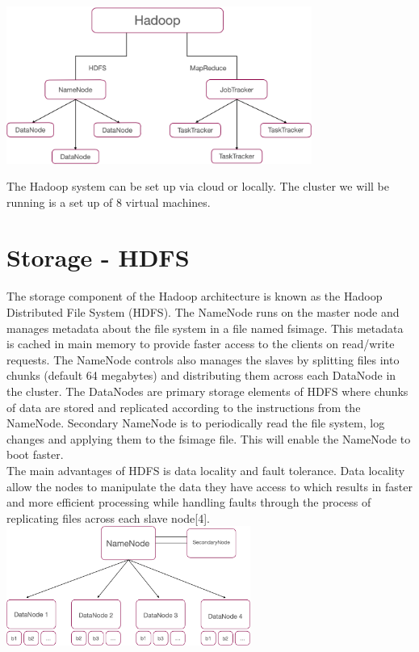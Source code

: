 \documentclass[11pt]{book}
\begin{document}
\begin{center}
 \includegraphics[width=10cm]{hadoop}\\
 \end{center}

The Hadoop system can be set up via cloud or locally. The cluster we will be running is a set up of 8 virtual machines.

\section{Storage - HDFS}

The storage component of the Hadoop architecture is known as the Hadoop Distributed File System (HDFS). The NameNode runs on the master node and manages metadata about the file system in a file named fsimage. This metadata is cached in main memory to provide faster access to the clients on read/write requests. The NameNode controls also manages the slaves by splitting files into chunks (default 64 megabytes) and distributing them across each DataNode in the cluster. The DataNodes are primary storage elements of HDFS where chunks of data are stored and replicated according to the instructions from the NameNode. Secondary NameNode is to periodically read the file system, log changes and applying them to the fsimage file. This will enable the NameNode to boot faster.\\

The main advantages of HDFS is data locality and fault tolerance. Data locality allow the nodes to manipulate the data they have access to which results in faster and more efficient processing while handling faults through the process of replicating files across each slave node[4].\\

\includegraphics[width=8cm]{hdfs}
\end{document}

